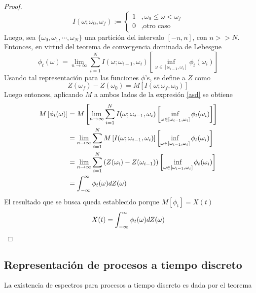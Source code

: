 \begin{proof}
\begin{equation}
I(\omega; \omega_0, \omega_f) := \begin{cases}
1 &, \omega_0 \leq \omega < \omega_f \\
0 &, \text{otro caso}
\end{cases}
\end{equation}
Luego, sea $\{\omega_0, \omega_1, \cdots, \omega_N\}$ una partición del intervalo $[-n,n]$, con $n>>N$. Entonces, en virtud del teorema de convergencia dominada de Lebesgue
\begin{equation}
\phi_t(\omega) = \lim_{n\rightarrow\infty} \sum_{i=1}^{N} I(\omega; \omega_{i-1}, \omega_i) \left[  \inf_{\omega \in [\omega_{i-1},\omega_i]} \phi_t(\omega_{i})\right]
\label{asd}
\end{equation}
Usando tal representación para las funciones $\phi$'s, se define a $Z$ como
\begin{equation}
Z(\omega_f) - Z(\omega_0) = M\left[ I(\omega; \omega_f, \omega_0) \right]
\end{equation}
Luego entonces, aplicando $M$ a ambos lados de la expresión \ref{asd} se obtiene
\begin{align*}
M\left[ \phi_t(\omega) \right] &= M\left[ \lim_{n\rightarrow\infty} \sum_{i=1}^{N} I(\omega; \omega_{i-1}, \omega_i) \left[  \inf_{\omega \in [\omega_{i-1},\omega_i]} \phi_t(\omega_{i})\right] \right] \\
&= \lim_{n\rightarrow\infty} \sum_{i=1}^{N} M\left[I(\omega; \omega_{i-1}, \omega_i) \right] \left[  \inf_{\omega \in [\omega_{i-1},\omega_i]} \phi_t(\omega_{i})\right] \\
&= \lim_{n\rightarrow\infty} \sum_{i=1}^{N} \left( Z(\omega_i) - Z(\omega_{i-1})\right) \left[  \inf_{\omega \in [\omega_{i-1},\omega_i]} \phi_t(\omega_{i})\right] \\
&= \int_{-\infty}^{\infty} \phi_t(\omega) dZ(\omega)
\end{align*}
El resultado que se busca queda establecido porque $M[\phi_t] = X(t)$
\begin{equation}
X(t) = \int_{-\infty}^{\infty} \phi_t(\omega) dZ(\omega)
\end{equation}
\end{proof}



\subsection{Representación de procesos a tiempo discreto}

La existencia de espectros para procesos a tiempo discreto es dada por el teorema

